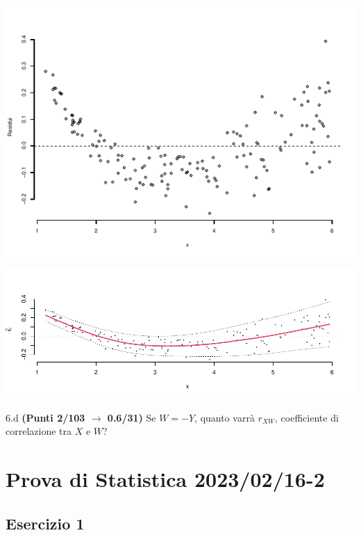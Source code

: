 \documentclass[
  11pt,
]{book}
\theoremstyle{mytheoremstyle}
\theoremstyle{mydefstyle}
\newenvironment{sol}
  {
  \begin{tcolorbox}[enhanced,breakable,arc=0.1mm,boxrule=1pt,colback=white,colframe=iblue,
  title=\bf \fontfamily{lmss}\selectfont \hspace{.5 cm} Soluzione,drop fuzzy shadow]

}{
\end{tcolorbox}
  }
\begin{document}
\begin{center}\includegraphics{Esami_passati_con_soluzioni_files/figure-latex/2023-18,-1} \end{center}

\begin{sol}

\begin{center}\includegraphics{Esami_passati_con_soluzioni_files/figure-latex/2023-19,-1} \end{center}

\end{sol}

6.d \textbf{(Punti 2/103 \(\rightarrow\) 0.6/31)} Se \(W=- Y\), quanto varrà \(r_{XW}\), coefficiente di correlazione tra \(X\) e \(W\)?

\section{Prova di Statistica 2023/02/16-2}\label{prova-di-statistica-20230216-2}

\subsection{Esercizio 1}\label{esercizio-1-23}
\end{document}

